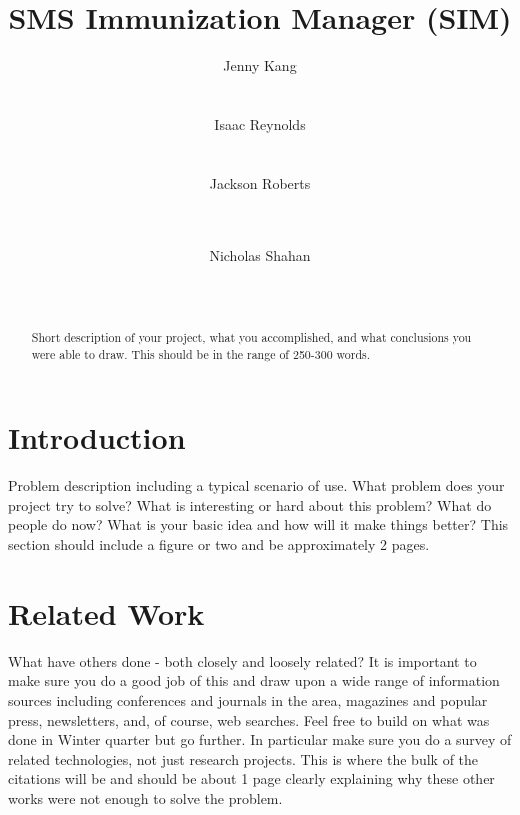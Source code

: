 \documentclass{acm_proc_article-sp}
\begin{document}
\title{SMS Immunization Manager (SIM)}

\author{
       \alignauthor
       Jenny Kang\\
              \\
              \\
       \alignauthor
       Isaac Reynolds\\
              \\
              \\
       \alignauthor 
       Jackson Roberts\\
              \\
              \\
       \and 
       \alignauthor 
       Nicholas Shahan\\
              \\
              \\
}

\maketitle
\begin{abstract}
Short description of your project, what you accomplished, and what conclusions 
you were able to draw. This should be in the range of 250-300 words.
\end{abstract}

\section{Introduction}
Problem description including a typical scenario of use. What problem does your project try to solve? What is interesting or hard about this problem? What do people do now?  What is your basic idea and how will it make things better? This section should include a figure or two and be approximately 2 pages.

\section{Related Work}
What have others done - both closely and loosely related?  It is important to make sure you do a good job of this and draw upon a wide range of information sources including conferences and journals in the area, magazines and popular press, newsletters, and, of course, web searches.  Feel free to build on what was done in Winter quarter but go further.  In particular make sure you do a survey of related technologies, not just research projects.  This is where the bulk of the citations will be and should be about 1 page clearly explaining why these other works were not enough to solve the problem.
\end{document}
